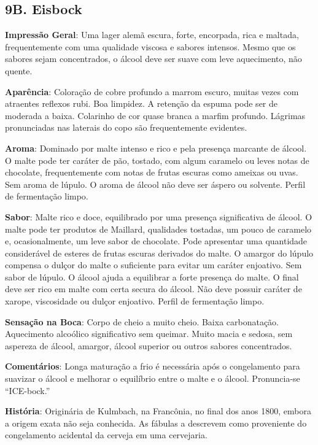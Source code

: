 \subsection*{9B. Eisbock}
\textbf{Impressão Geral}: Uma lager alemã escura, forte, encorpada, rica e maltada, frequentemente com uma qualidade viscosa e sabores intensos. Mesmo que os sabores sejam concentrados, o álcool deve ser suave com leve aquecimento, não quente.

\textbf{Aparência}: Coloração de cobre profundo a marrom escuro, muitas vezes com atraentes reflexos rubi. Boa limpidez. A retenção da espuma pode ser de moderada a baixa. Colarinho de cor quase branca a marfim profundo. Lágrimas pronunciadas nas laterais do copo são frequentemente evidentes.

\textbf{Aroma}: Dominado por malte intenso e rico e pela presença marcante de álcool. O malte pode ter caráter de pão, tostado, com algum caramelo ou leves notas de chocolate, frequentemente com notas de frutas escuras como ameixas ou uvas. Sem aroma de lúpulo. O aroma de álcool não deve ser áspero ou solvente. Perfil de fermentação limpo.

\textbf{Sabor}: Malte rico e doce, equilibrado por uma presença significativa de álcool. O malte pode ter produtos de Maillard, qualidades tostadas, um pouco de caramelo e, ocasionalmente, um leve sabor de chocolate. Pode apresentar uma quantidade considerável de esteres de frutas escuras derivados do malte. O amargor do lúpulo compensa o dulçor do malte o suficiente para evitar um caráter enjoativo. Sem sabor de lúpulo. O álcool ajuda a equilibrar a forte presença do malte. O final deve ser rico em malte com certa secura do álcool. Não deve possuir caráter de xarope, viscosidade ou dulçor enjoativo. Perfil de fermentação limpo.

\textbf{Sensação na Boca}: Corpo de cheio a muito cheio. Baixa carbonatação. Aquecimento alcoólico significativo sem queimar. Muito macia e sedosa, sem aspereza de álcool, amargor, álcool superior ou outros sabores concentrados.

\textbf{Comentários}: Longa maturação a frio é necessária após o congelamento para suavizar o álcool e melhorar o equilíbrio entre o malte e o álcool. Pronuncia-se “ICE-bock.”

\textbf{História}: Originária de Kulmbach, na Francônia, no final dos anos 1800, embora a origem exata não seja conhecida. As fábulas a descrevem como proveniente do congelamento acidental da cerveja em uma cervejaria.

